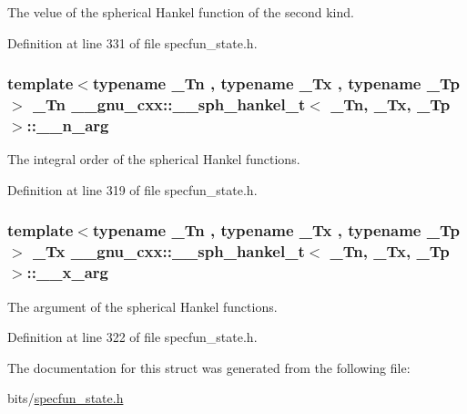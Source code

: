 The velue of the spherical Hankel function of the second kind. 



Definition at line 331 of file specfun\+\_\+state.\+h.

\subsubsection[{\texorpdfstring{\+\_\+\+\_\+n\+\_\+arg}{__n_arg}}]{\setlength{\rightskip}{0pt plus 5cm}template$<$typename \+\_\+\+Tn , typename \+\_\+\+Tx , typename \+\_\+\+Tp $>$ \+\_\+\+Tn {\bf \+\_\+\+\_\+gnu\+\_\+cxx\+::\+\_\+\+\_\+sph\+\_\+hankel\+\_\+t}$<$ \+\_\+\+Tn, \+\_\+\+Tx, \+\_\+\+Tp $>$\+::\+\_\+\+\_\+n\+\_\+arg}\hypertarget{struct____gnu__cxx_1_1____sph__hankel__t_a43f671e87375a9077262676564df20c5}{}\label{struct____gnu__cxx_1_1____sph__hankel__t_a43f671e87375a9077262676564df20c5}


The integral order of the spherical Hankel functions. 



Definition at line 319 of file specfun\+\_\+state.\+h.

\subsubsection[{\texorpdfstring{\+\_\+\+\_\+x\+\_\+arg}{__x_arg}}]{\setlength{\rightskip}{0pt plus 5cm}template$<$typename \+\_\+\+Tn , typename \+\_\+\+Tx , typename \+\_\+\+Tp $>$ \+\_\+\+Tx {\bf \+\_\+\+\_\+gnu\+\_\+cxx\+::\+\_\+\+\_\+sph\+\_\+hankel\+\_\+t}$<$ \+\_\+\+Tn, \+\_\+\+Tx, \+\_\+\+Tp $>$\+::\+\_\+\+\_\+x\+\_\+arg}\hypertarget{struct____gnu__cxx_1_1____sph__hankel__t_a265ee0cdcca2d491c29b520a0fd4e4b3}{}\label{struct____gnu__cxx_1_1____sph__hankel__t_a265ee0cdcca2d491c29b520a0fd4e4b3}


The argument of the spherical Hankel functions. 



Definition at line 322 of file specfun\+\_\+state.\+h.



The documentation for this struct was generated from the following file\+:\begin{DoxyCompactItemize}
\item 
bits/\hyperlink{specfun__state_8h}{specfun\+\_\+state.\+h}\end{DoxyCompactItemize}
